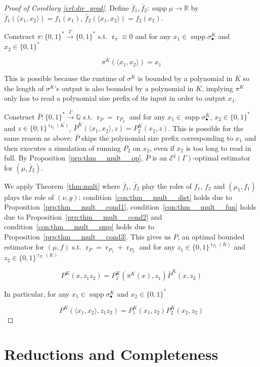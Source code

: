 \documentclass{article}
\numberwithin{equation}{section}
\theoremstyle{definition}
\theoremstyle{plain}
\newcommand{\Bool}{\{0,1\}}
\newcommand{\Words}{{\Bool^*}}
\DeclareMathOperator{\Supp}{supp}
\DeclareMathOperator{\R}{r}
\newcommand{\Rats}{\mathbb{Q}}
\newcommand{\Reals}{\mathbb{R}}
\newcommand{\Chev}[1]{\langle #1 \rangle}
\newcommand{\Fall}{\mathcal{E}}
\newcommand{\ESG}{\Fall^\sharp(\Gamma)}
\newcommand{\Scheme}{\xrightarrow{\Gamma}}
\begin{document}
\begin{proof}[Proof of Corollary \ref{crl:dir_prod}]

Define $\bar{f}_1, \bar{f}_2: \Supp \mu \rightarrow \Reals$ by $\bar{f}_1(\Chev{x_1,x_2})=f_1(x_1)$, $\bar{f}_2(\Chev{x_1,x_2})=f_2(x_2)$. 

Construct $\pi: \Words \Scheme \Words$ s.t. $\R_\pi \equiv 0$ and for any ${x_1 \in \Supp \sigma_\bullet^K}$ and $x_2 \in \Words$ 

\[\pi^K(\Chev{x_1,x_2})=x_1\]

This is possible because the runtime of $\sigma^K$ is bounded by a polynomial in $K$ so the length of $\sigma^K$'s output is also bounded by a polynomial in $K$, implying $\pi^K$ only has to read a polynomial size prefix of its input in order to output $x_1$.

Construct $\bar{P}: \Words \Scheme \Rats$ s.t. $\R_{\bar{P}}=\R_{P_2}$ and for any $x_1 \in \Supp \sigma_\bullet^K$, $x_2 \in \Words$ and $z \in \Bool^{\R_{P_2}(K)}$, $\bar{P}^K(\Chev{x_1,x_2},z)=P_2^K(x_2,z)$. This is possible for the same reason as above: $\bar{P}$ skips the polynomial size prefix corresponding to $x_1$ and then executes a simulation of running $P_2$ on $x_2$, even if $x_2$ is too long to read in full. By Proposition~\ref{prp:thm__mult__op}, $\bar{P}$ is an $\ESG$-optimal estimator for $(\mu,\bar{f}_2)$. 

We apply Theorem~\ref{thm:mult} where $\bar{f}_1$, $\bar{f}_2$ play the roles of $f_1$, $f_2$ and $(\mu_1, f_1)$ plays the role of $(\nu,g)$: condition~\ref{con:thm__mult__dist} holds due to Proposition~\ref{prp:thm__mult__cond1}, condition~\ref{con:thm__mult__fun} holds due to Proposition~\ref{prp:thm__mult__cond2} and condition~\ref{con:thm__mult__smp} holds due to Proposition~\ref{prp:thm__mult__cond3}. This gives us $P$, an optimal bounded estimator for $(\mu, f)$ s.t. ${\R_P=\R_{P_1}+\R_{P_2}}$ and for any ${z_1 \in \Bool^{\R_{P_1}(K)}}$ and $z_2 \in \Bool^{\R_{P_1}(K)}$ 

\[P^K(x, z_1 z_2) = P_1^K(\pi^K(x),z_1) \bar{P}^K(x,z_2)\]

In particular, for any ${x_1 \in \Supp \sigma_\bullet^K}$ and $x_2 \in \Words$

\[P^K(\Chev{x_1,x_2}, z_1 z_2)=P_1^K(x_1,z_2)P_2^K(x_2,z_2)\]
%
\end{proof}

\section{Reductions and Completeness}
\label{sec:reductions}
\end{document}
